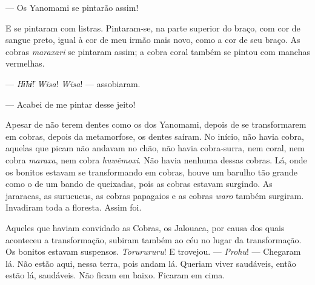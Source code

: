 --- Os Yanomami se pintarão assim! 

E se pintaram com listras. Pintaram-se, na parte superior do braço, com
cor de sangue preto, igual à cor de meu irmão mais novo, como a cor de
seu braço. As cobras \textit{maraxari} se pintaram assim; a cobra coral
também se pintou com manchas vermelhas. 




--- \textit{Hɨ̃hɨ̃}! \textit{Wĩsa}! \textit{Wĩsa}! --- assobiaram. 


--- Acabei de me pintar desse jeito! 

Apesar de não terem dentes como os dos Yanomami, depois de se
transformarem em cobras, depois da metamorfose, os dentes saíram. No
início, não havia cobra, aquelas que picam não andavam no chão, não
havia cobra-surra, nem coral, nem cobra \textit{maraxa}, nem
cobra \textit{huwëmoxi}. Não havia nenhuma dessas cobras. Lá, onde os
bonitos estavam se transformando em cobras, houve um barulho tão grande
como o de um bando de queixadas, pois as cobras estavam surgindo. As
jararacas, as surucucus, as cobras papagaios e as
cobras \textit{waro} também surgiram. Invadiram toda a floresta. Assim foi. 

Aqueles que haviam convidado as Cobras, os Jalouaca, por causa dos quais
aconteceu a transformação, subiram também ao céu no lugar da
transformação. Os bonitos estavam suspensos. \textit{Torurururu}! E
trovejou. --- \textit{Prohu}! --- Chegaram lá. Não estão aqui, nessa terra,
pois andam lá. Queriam viver saudáveis, então estão lá, saudáveis. Não
ficam em baixo. Ficaram em cima. 

